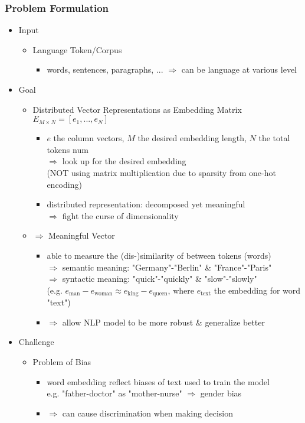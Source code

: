 \subsubsection{Problem Formulation}
\begin{itemize}
\item Input
	\begin{itemize}
	\item Language Token/Corpus
		\begin{itemize}
		\item words, sentences, paragraphs, ... $\Rightarrow$ can be language at various level
		\end{itemize}
	\end{itemize}
\item Goal
	\begin{itemize}
	\item Distributed Vector Representations as Embedding Matrix $E_{M\times N} = [e_1,...,e_N]$
		\begin{itemize}
		\item $e$ the column vectors, $M$ the desired embedding length, $N$ the total tokens num \\
		$\Rightarrow$ look up for the desired embedding \\
		(NOT using matrix multiplication due to sparsity from one-hot encoding)
		\item distributed representation: decomposed yet meaningful \\
		$\Rightarrow$ fight the curse of dimensionality
		\end{itemize}
	\item $\Rightarrow$ Meaningful Vector
		\begin{itemize}
		\item able to measure the (dis-)similarity of between tokens (words) \\
		$\Rightarrow$ semantic meaning: "Germany"-"Berlin" \& "France"-"Paris" \\
		$\Rightarrow$ syntactic meaning: "quick"-"quickly" \& "slow"-"slowly" \\
		(e.g. $e_\text{man} - e_\text{woman} \approx e_\text{king} - e_\text{queen}$, where $e_\text{text}$ the embedding for word "text") 
		\item $\Rightarrow$ allow NLP model to be more robust \& generalize better
		\end{itemize}
	\end{itemize}
\item Challenge
	\begin{itemize}
	\item Problem of Bias
		\begin{itemize}
		\item word embedding reflect biases of text used to train the model \\
		e.g. "father-doctor" as "mother-nurse" $\Rightarrow$ gender bias
		\item $\Rightarrow$ can cause discrimination when making decision
		\end{itemize}
	\end{itemize}
\end{itemize}


